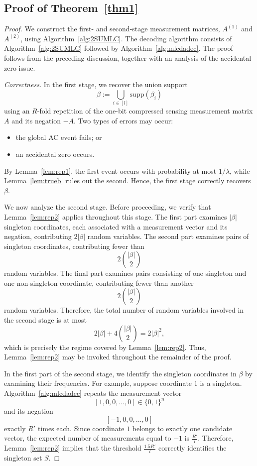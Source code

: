 \documentclass[10pt,a4paper]{amsart}
\newcommand{\supp}{\mathrm{supp}}
\begin{document}
\subsection{Proof of Theorem~\ref{thm1}}
\begin{proof}
We construct the first- and second-stage measurement matrices, $A^{(1)}$ and $A^{(2)}$, using Algorithm~\ref{alg:2SUMLC}. The decoding algorithm consists of Algorithm~\ref{alg:2SUMLC} followed by Algorithm~\ref{alg:mlcdadec}. The proof follows from the preceding discussion, together with an analysis of the accidental zero issue.

\emph{Correctness.}
In the first stage, we recover the union support
\[
\beta:=\bigcup_{i\in[l]}\supp(\beta_i)
\]
using an $R$-fold repetition of the one-bit compressed sensing measurement matrix $A$ and its negation $-A$. Two types of errors may occur:
\begin{itemize}
\item[(i)] the global AC event fails; or
\item[(ii)] an accidental zero occurs.
\end{itemize}
By Lemma~\ref{lem:rep1}, the first event occurs with probability at most $1/\lambda$, while Lemma~\ref{lem:trueb} rules out the second. Hence, the first stage correctly recovers $\beta$.

We now analyze the second stage. Before proceeding, we verify that Lemma~\ref{lem:rep2} applies throughout this stage. The first part examines $|\beta|$ singleton coordinates, each associated with a measurement vector and its negation, contributing $2|\beta|$ random variables. The second part examines pairs of singleton coordinates, contributing fewer than
\[
2\binom{|\beta|}{2}
\]
random variables. The final part examines pairs consisting of one singleton and one non-singleton coordinate, contributing fewer than another
\[
2\binom{|\beta|}{2}
\]
random variables. Therefore, the total number of random variables involved in the second stage is at most
\[
2|\beta|+4\binom{|\beta|}{2}
=2|\beta|^2,
\]
which is precisely the regime covered by Lemma~\ref{lem:rep2}. Thus, Lemma~\ref{lem:rep2} may be invoked throughout the remainder of the proof.

In the first part of the second stage, we identify the singleton coordinates in $\beta$ by examining their frequencies. For example, suppose coordinate $1$ is a singleton. Algorithm~\ref{alg:mlcdadec} repeats the measurement vector
\[
[1,0,0,\ldots,0]\in\{0,1\}^n
\]
and its negation
\[
[-1,0,0,\ldots,0]
\]
exactly $R'$ times each. Since coordinate $1$ belongs to exactly one candidate vector, the expected number of measurements equal to $-1$ is $\frac{R'}{l}$. Therefore, Lemma~\ref{lem:rep2} implies that the threshold $\frac{1.5R'}{l}$ correctly identifies the singleton set $S$.


\end{proof}
\end{document}
